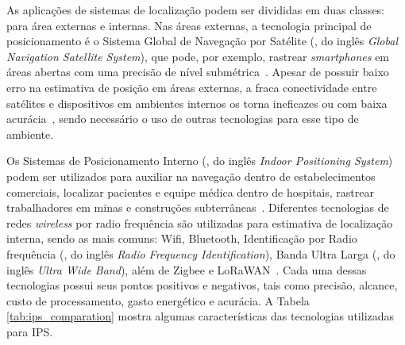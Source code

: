 As aplicações de sistemas de localização podem ser divididas em duas classes: para área externas e internas. Nas áreas externas, a tecnologia principal de posicionamento é o Sistema Global de Navegação por Satélite (, do inglês \textit{Global Navigation Satellite System}), que pode, por exemplo, rastrear \textit{smartphones} em áreas abertas com uma precisão de nível submétrica~\cite{Liu2022}. Apesar de possuir baixo erro na estimativa de posição em áreas externas, a fraca conectividade entre satélites e dispositivos em ambientes internos os torna ineficazes ou com baixa acurácia~\cite{Guo2020}, sendo necessário o uso de outras tecnologias para esse tipo de ambiente.

Os Sistemas de Posicionamento Interno (, do inglês \textit{Indoor Positioning System}) podem ser utilizados para auxiliar na navegação dentro de estabelecimentos comerciais, localizar pacientes e equipe médica dentro de hospitais, rastrear trabalhadores em minas e construções subterrâneas~\cite{Farahsari2022}.  Diferentes tecnologias de redes \textit{wireless} por radio frequência são utilizadas para estimativa de localização interna, sendo as mais comuns: Wifi, Bluetooth, Identificação por Radio frequência (, do inglês \textit{Radio Frequency Identification}), Banda Ultra Larga (, do inglês \textit{Ultra Wide Band}), além de Zigbee e LoRaWAN~\cite{Sadowski2018}. Cada uma dessas tecnologias possui seus pontos positivos e negativos, tais como precisão, alcance, custo de processamento, gasto energético e acurácia. A Tabela \ref{tab:ips_comparation} mostra algumas características das tecnologias utilizadas para IPS.

